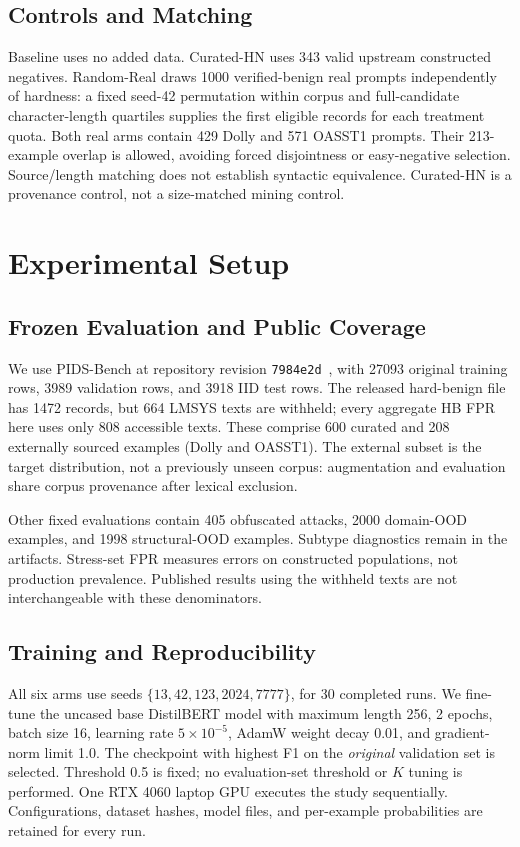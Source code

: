 \documentclass[conference]{IEEEtran}
\newcommand{\NTrain}{27093}
\newcommand{\NVal}{3989}
\newcommand{\NIID}{3918}
\newcommand{\NHB}{808}
\newcommand{\NReleasedHB}{1472}
\newcommand{\NWithheld}{664}
\newcommand{\NObf}{405}
\newcommand{\NDomain}{2000}
\newcommand{\NStruct}{1998}
\newcommand{\NCurAug}{343}
\newcommand{\NDollySelected}{429}
\newcommand{\NOasstSelected}{571}
\newcommand{\NOverlap}{213}
\newcommand{\NExternal}{208}
\newcommand{\NCuratedHB}{600}
\newcommand{\PrimaryK}{1000}
\newcommand{\NEpochs}{2}
\newcommand{\NBatch}{16}
\newcommand{\MaxLength}{256}
\newcommand{\NRuns}{30}
\newcommand{\Threshold}{0.5}
\newcommand{\WeightDecay}{0.01}
\newcommand{\MaxGradNorm}{1.0}
\begin{document}
\subsection{Controls and Matching}
Baseline uses no added data. Curated-HN uses \NCurAug{} valid upstream constructed negatives. Random-Real draws \PrimaryK{} verified-benign real prompts independently of hardness: a fixed seed-42 permutation within corpus and full-candidate character-length quartiles supplies the first eligible records for each treatment quota. Both real arms contain \NDollySelected{} Dolly and \NOasstSelected{} OASST1 prompts. Their \NOverlap{}-example overlap is allowed, avoiding forced disjointness or easy-negative selection. Source/length matching does not establish syntactic equivalence. Curated-HN is a provenance control, not a size-matched mining control.

\section{Experimental Setup}
\subsection{Frozen Evaluation and Public Coverage}
We use PIDS-Bench at repository revision \texttt{7984e2d}~\cite{pidsrepo}, with \NTrain{} original training rows, \NVal{} validation rows, and \NIID{} IID test rows. The released hard-benign file has \NReleasedHB{} records, but \NWithheld{} LMSYS texts are withheld; every aggregate HB FPR here uses only \NHB{} accessible texts. These comprise \NCuratedHB{} curated and \NExternal{} externally sourced examples (Dolly and OASST1). The external subset is the target distribution, not a previously unseen corpus: augmentation and evaluation share corpus provenance after lexical exclusion.

Other fixed evaluations contain \NObf{} obfuscated attacks, \NDomain{} domain-OOD examples, and \NStruct{} structural-OOD examples. Subtype diagnostics remain in the artifacts. Stress-set FPR measures errors on constructed populations, not production prevalence. Published results using the withheld texts are not interchangeable with these denominators.

\subsection{Training and Reproducibility}
All six arms use seeds $\{13,42,123,2024,7777\}$, for \NRuns{} completed runs. We fine-tune the uncased base DistilBERT model with maximum length \MaxLength, \NEpochs{} epochs, batch size \NBatch, learning rate $5\times10^{-5}$, AdamW weight decay \WeightDecay, and gradient-norm limit \MaxGradNorm. The checkpoint with highest F1 on the \emph{original} validation set is selected. Threshold \Threshold{} is fixed; no evaluation-set threshold or $K$ tuning is performed. One RTX 4060 laptop GPU executes the study sequentially. Configurations, dataset hashes, model files, and per-example probabilities are retained for every run.
\end{document}
